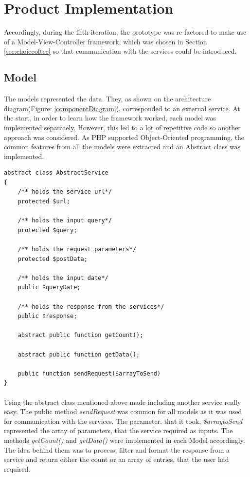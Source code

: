 \documentclass{l4proj}
\begin{document}
\section{Product Implementation}
\paragraph{}
Accordingly, during the fifth iteration, the prototype was re-factored to make use of a Model-View-Controller framework, which was chosen in Section \ref{sec:choiceoftec} so that communication with the services could be introduced.

\subsection{Model}
\label{sub:model}
\paragraph{}
The models represented the data. They, as shown on the architecture diagram(Figure: \ref{componentDiagram}), corresponded to an external service. At the start, in order to learn how the framework worked, each model was implemented separately. However, this led to a lot of repetitive code so another approach was considered. As PHP supported Object-Oriented programming, the common features from all the models were extracted and an Abstract class was implemented. 
\begin{lstlisting}
abstract class AbstractService
{
	/** holds the service url*/
	protected $url;
	
	/** holds the input query*/
	protected $query;
	
	/** holds the request parameters*/
	protected $postData;
	
	/** holds the input date*/
	public $queryDate;
	
	/** holds the response from the services*/
	public $response;
	
	abstract public function getCount();
	
	abstract public function getData();
	
	public function sendRequest($arrayToSend)  
}  
\end{lstlisting}
\paragraph{}
Using the abstract class mentioned above made including another service really easy. The public method \textit{sendRequest} was common for all models as it was used for communication with the services. The parameter, that it took, \textit{\$arraytoSend} represented the array of parameters, that the service required as inputs. The methods \textit{getCount()} and \textit{getData()} were implemented in each Model accordingly. The idea behind them was to process, filter and format the response from a service and return either the count or an array of entries, that the user had required.  
\end{document}
